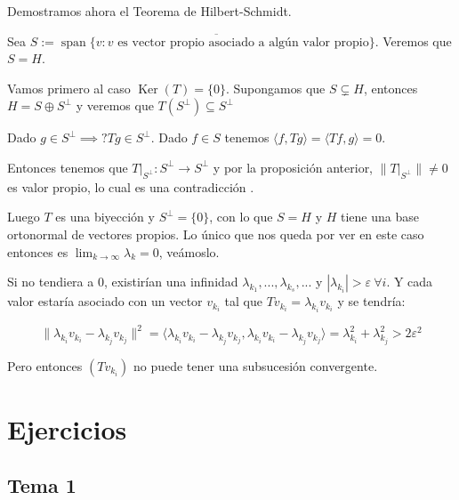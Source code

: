 \documentclass[openany]{book}
\begin{document}
Demostramos ahora el Teorema de Hilbert-Schmidt.

\begin{demonstration}
    Sea $ S:= \overline{\operatorname{span} \{v:  v \text{ es vector propio asociado a algún valor propio}\}}$. Veremos que $ S = H$.

    Vamos primero al caso $ \operatorname{Ker}(T) = \{0\}$. Supongamos que $ S \subsetneq H$, entonces $ H = S \oplus S^\perp $ y veremos que $ T(S^\perp) \subseteq  S^\perp$

    Dado $ g \in S^\perp \implies ? Tg \in S^{\perp}$. Dado $ f \in S$ tenemos $ \langle f, Tg \rangle = \langle Tf, g \rangle = 0$.

    Entonces tenemos que $ T|_{S^{\perp}}: S^\perp \to S^\perp$ y por la proposición anterior, $ \|T|_{S^{\perp}}\| \ne 0$ es valor propio, lo cual es una contradicción .

    Luego $ T$ es una biyección y $ S^{\perp} = \{0\}$, con lo que $ S = H$ y $ H$ tiene una base ortonormal de vectores propios. Lo único que nos queda por ver en este caso entonces es $ \lim_{k \to \infty} \lambda_k = 0 $, veámoslo.

    Si no tendiera a 0, existirían una infinidad $ \lambda _{k_1},...,\lambda _{k_{s}},...$ y $ |\lambda _{k_i}| > \varepsilon \ \forall i$. Y cada valor estaría asociado con un vector $ v_{k_i}$ tal que $ Tv_{k_i} = \lambda _{k_i}v_{k_i}$ y se tendría:

    $$ \|\lambda _{k_i} v_{k_i} - \lambda _{k_j}v_{k_j}\|^2 = \langle \lambda _{k_i}v_{k_i}- \lambda _{k_j}v_{k_j}, \lambda _{k_i}v_{k_i}-\lambda _{k_j}v_{k_j} \rangle = \lambda_{k_i}^2 + \lambda_{k_j}^2 > 2 \varepsilon^2 $$

    Pero entonces $ (Tv_{k_i})$ no puede tener una subsucesión convergente.

\end{demonstration}

\chapter{Ejercicios}

\section{Tema 1}

\setcounter{ex}{3}
\end{document}
